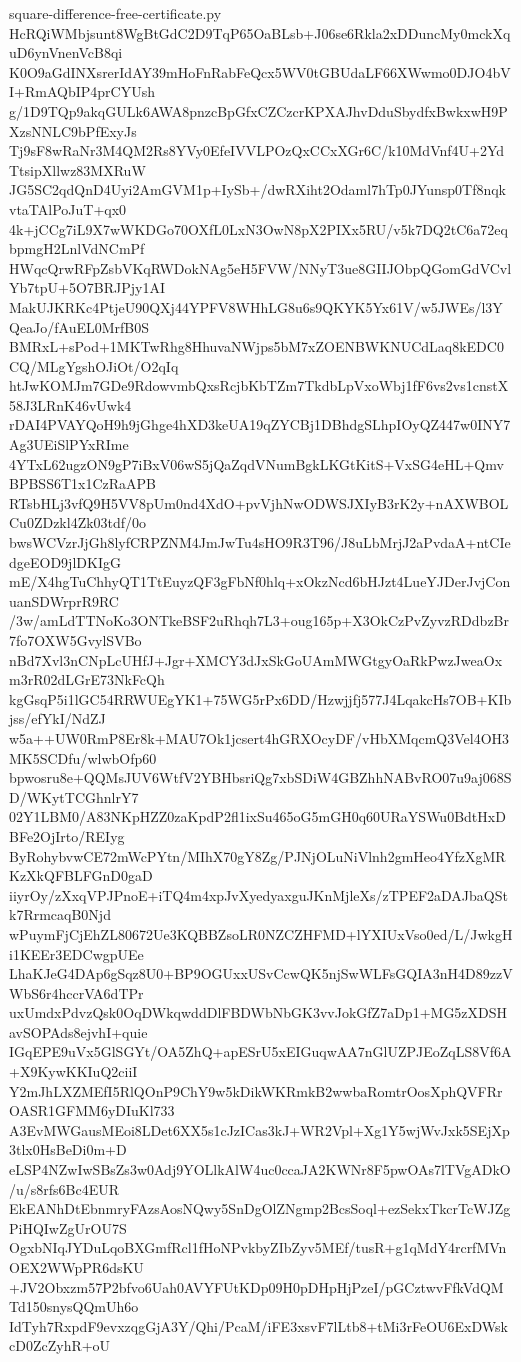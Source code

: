 \documentclass[11pt]{article}
\theoremstyle{definition}
\theoremstyle{remark}
\begin{document}
\begin{filecontents*}[overwrite]{square-difference-free-certificate.py}
HcRQiWMbjsunt8WgBtGdC2D9TqP65OaBLsb+J06se6Rkla2xDDuncMy0mckXquD6ynVnenVcB8qi
K0O9aGdINXsrerIdAY39mHoFnRabFeQcx5WV0tGBUdaLF66XWwmo0DJO4bVI+RmAQbIP4prCYUsh
g/1D9TQp9akqGULk6AWA8pnzcBpGfxCZCzcrKPXAJhvDduSbydfxBwkxwH9PXzsNNLC9bPfExyJs
Tj9sF8wRaNr3M4QM2Rs8YVy0EfeIVVLPOzQxCCxXGr6C/k10MdVnf4U+2YdTtsipXllwz83MXRuW
JG5SC2qdQnD4Uyi2AmGVM1p+IySb+/dwRXiht2Odaml7hTp0JYunsp0Tf8nqkvtaTAlPoJuT+qx0
4k+jCCg7iL9X7wWKDGo70OXfL0LxN3OwN8pX2PIXx5RU/v5k7DQ2tC6a72eqbpmgH2LnlVdNCmPf
HWqcQrwRFpZsbVKqRWDokNAg5eH5FVW/NNyT3ue8GIIJObpQGomGdVCvlYb7tpU+5O7BRJPjy1AI
MakUJKRKc4PtjeU90QXj44YPFV8WHhLG8u6s9QKYK5Yx61V/w5JWEs/l3YQeaJo/fAuEL0MrfB0S
BMRxL+sPod+1MKTwRhg8HhuvaNWjps5bM7xZOENBWKNUCdLaq8kEDC0CQ/MLgYgshOJiOt/O2qIq
htJwKOMJm7GDe9RdowvmbQxsRcjbKbTZm7TkdbLpVxoWbj1fF6vs2vs1cnstX58J3LRnK46vUwk4
rDAI4PVAYQoH9h9jGhge4hXD3keUA19qZYCBj1DBhdgSLhpIOyQZ447w0INY7Ag3UEiSlPYxRIme
4YTxL62ugzON9gP7iBxV06wS5jQaZqdVNumBgkLKGtKitS+VxSG4eHL+QmvBPBSS6T1x1CzRaAPB
RTsbHLj3vfQ9H5VV8pUm0nd4XdO+pvVjhNwODWSJXIyB3rK2y+nAXWBOLCu0ZDzkl4Zk03tdf/0o
bwsWCVzrJjGh8lyfCRPZNM4JmJwTu4sHO9R3T96/J8uLbMrjJ2aPvdaA+ntCIedgeEOD9jlDKIgG
mE/X4hgTuChhyQT1TtEuyzQF3gFbNf0hlq+xOkzNcd6bHJzt4LueYJDerJvjConuanSDWrprR9RC
/3w/amLdTTNoKo3ONTkeBSF2uRhqh7L3+oug165p+X3OkCzPvZyvzRDdbzBr7fo7OXW5GvylSVBo
nBd7Xvl3nCNpLcUHfJ+Jgr+XMCY3dJxSkGoUAmMWGtgyOaRkPwzJweaOxm3rR02dLGrE73NkFcQh
kgGsqP5i1lGC54RRWUEgYK1+75WG5rPx6DD/Hzwjjfj577J4LqakcHs7OB+KIbjss/efYkI/NdZJ
w5a++UW0RmP8Er8k+MAU7Ok1jcsert4hGRXOcyDF/vHbXMqcmQ3Vel4OH3MK5SCDfu/wlwbOfp60
bpwosru8e+QQMsJUV6WtfV2YBHbsriQg7xbSDiW4GBZhhNABvRO07u9aj068SD/WKytTCGhnlrY7
02Y1LBM0/A83NKpHZZ0zaKpdP2fl1ixSu465oG5mGH0q60URaYSWu0BdtHxDBFe2OjIrto/REIyg
ByRohybvwCE72mWcPYtn/MIhX70gY8Zg/PJNjOLuNiVlnh2gmHeo4YfzXgMRKzXkQFBLFGnD0gaD
iiyrOy/zXxqVPJPnoE+iTQ4m4xpJvXyedyaxguJKnMjleXs/zTPEF2aDAJbaQStk7RrmcaqB0Njd
wPuymFjCjEhZL80672Ue3KQBBZsoLR0NZCZHFMD+lYXIUxVso0ed/L/JwkgHi1KEEr3EDCwgpUEe
LhaKJeG4DAp6gSqz8U0+BP9OGUxxUSvCcwQK5njSwWLFsGQIA3nH4D89zzVWbS6r4hccrVA6dTPr
uxUmdxPdvzQsk0OqDWkqwddDlFBDWbNbGK3vvJokGfZ7aDp1+MG5zXDSHavSOPAds8ejvhI+quie
IGqEPE9uVx5GlSGYt/OA5ZhQ+apESrU5xEIGuqwAA7nGlUZPJEoZqLS8Vf6A+X9KywKKIuQ2ciiI
Y2mJhLXZMEfI5RlQOnP9ChY9w5kDikWKRmkB2wwbaRomtrOosXphQVFRrOASR1GFMM6yDIuKl733
A3EvMWGausMEoi8LDet6XX5s1cJzICas3kJ+WR2Vpl+Xg1Y5wjWvJxk5SEjXp3tlx0HsBeDi0m+D
eLSP4NZwIwSBsZs3w0Adj9YOLlkAlW4uc0ccaJA2KWNr8F5pwOAs7lTVgADkO/u/s8rfs6Bc4EUR
EkEANhDtEbnmryFAzsAosNQwy5SnDgOlZNgmp2BcsSoql+ezSekxTkcrTcWJZgPiHQIwZgUrOU7S
OgxbNIqJYDuLqoBXGmfRcl1fHoNPvkbyZIbZyv5MEf/tusR+g1qMdY4rcrfMVnOEX2WWpPR6dsKU
+JV2Obxzm57P2bfvo6Uah0AVYFUtKDp09H0pDHpHjPzeI/pGCztwvFfkVdQMTd150snysQQmUh6o
IdTyh7RxpdF9evxzqgGjA3Y/Qhi/PcaM/iFE3xsvF7lLtb8+tMi3rFeOU6ExDWskcD0ZcZyhR+oU

\end{filecontents*}
\end{document}

